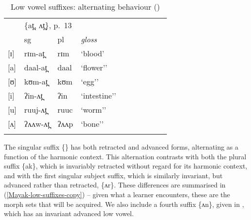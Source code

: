 \begin{table}
\caption{Low vowel suffixes: alternating behaviour (\citealt{Andersen:1999-Vs})\label{Mayak-variable-low-suffix-summary-blood}} 
\begin{tabular}{llllllllll}
\lsptoprule
&\multicolumn{2}{l}{\{a​t̪, ʌ​t̪\}, p.\ 13}\\ 
&{\sc sg}&{\sc pl}&{\it gloss}\\\midrule
{[}ɪ] &rɪm-a​t̪&rɪm&`blood'\\
{[}a] &daal-a​t̪&daal&`flower''\\%
{[}ʊ] &kʊm-a​t̪ &kʊm&`egg''\\%

{[}i] &ʔin-ʌ​t̪&ʔin&`intestine''\\%
{[}u] &ruuj-ʌ​t̪ &ruuc&`worm''\\%

{[}ʌ] &ʔʌʌw-ʌ​t̪&ʔʌʌp &`bone''\\%
\lspbottomrule
\end{tabular}
\end{table}

The singular suffix \{\} has both retracted and advanced forms, alternating as a function of the harmonic context. This alternation contrasts with both the plural suffix \{ak\}, which is invariably retracted without regard for its harmonic context, and with the first singular subject suffix, which is similarly invariant, but advanced rather than retracted, \{ʌr\}. These differences are summarised in (\ref{Mayak-low-suffixes-copy}) -- given what a learner encounters, these are the morph sets that will be acquired. We also include a fourth suffix \{ʌn\}, given in \citet{Andersen:2000}, which has an invariant advanced low vowel. 

